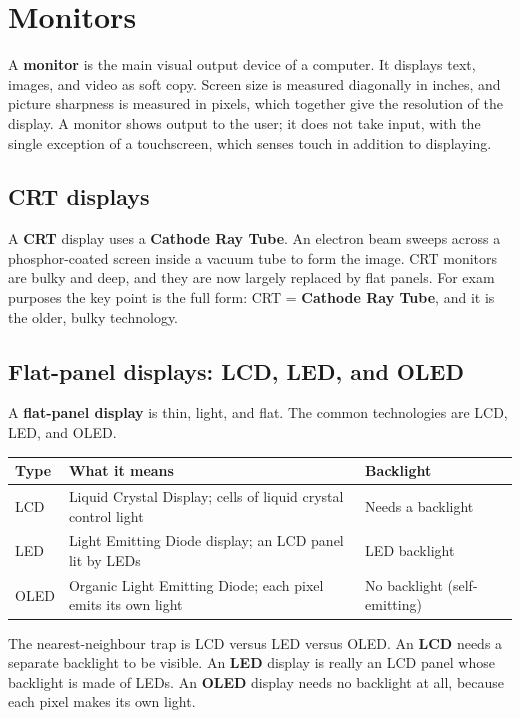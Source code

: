 \section{Monitors}
A \textbf{monitor} is the main visual output device of a computer. It displays
text, images, and video as soft copy. Screen size is measured diagonally in
inches, and picture sharpness is measured in pixels, which together give the
resolution of the display. A monitor shows output to the user; it does not
take input, with the single exception of a touchscreen, which senses touch in
addition to displaying.

\subsection{CRT displays}
A \textbf{CRT} display uses a \textbf{Cathode Ray Tube}. An electron beam
sweeps across a phosphor-coated screen inside a vacuum tube to form the image.
CRT monitors are bulky and deep, and they are now largely replaced by flat
panels. For exam purposes the key point is the full form: CRT = \textbf{Cathode
Ray Tube}, and it is the older, bulky technology.

\subsection{Flat-panel displays: LCD, LED, and OLED}
A \textbf{flat-panel display} is thin, light, and flat. The common
technologies are LCD, LED, and OLED.

\begin{center}
\begin{tabular}{p{}p{}p{}}
\toprule
\textbf{Type} & \textbf{What it means} & \textbf{Backlight} \\
\midrule
LCD & Liquid Crystal Display; cells of liquid crystal control light & Needs a backlight \\
LED & Light Emitting Diode display; an LCD panel lit by LEDs & LED backlight \\
OLED & Organic Light Emitting Diode; each pixel emits its own light & No backlight (self-emitting) \\
\bottomrule
\end{tabular}
\end{center}

The nearest-neighbour trap is LCD versus LED versus OLED. An \textbf{LCD}
needs a separate backlight to be visible. An \textbf{LED} display is really an
LCD panel whose backlight is made of LEDs. An \textbf{OLED} display needs no
backlight at all, because each pixel makes its own light.

